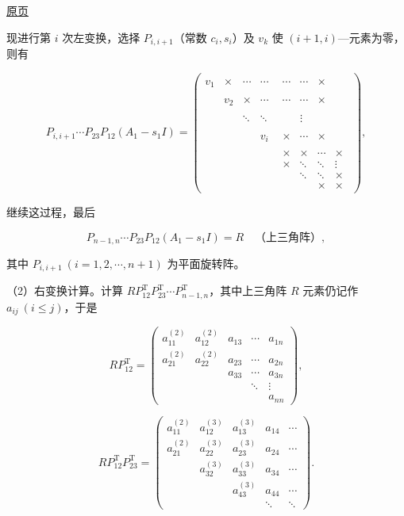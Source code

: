 \documentclass[
  10pt,
  fontset=fandol]{ctexart}
\begin{document}
\href{../../source-images/pdf-257.jpeg}{原页}

现进行第 \(i\) 次左变换，选择 \(P_{i,i+1}\)（常数 \(c_i,s_i\)）及 \(v_k\) 使 \((i+1,i)\)---元素为零，则有

\[
P_{i,i+1}\cdots P_{23}P_{12}(A_1-s_1I)
=\begin{pmatrix}
v_1&\times&\cdots&\cdots&\begin{matrix}\cdots&\cdots&\times\end{matrix}\\
&v_2&\times&\cdots&\begin{matrix}\cdots&\cdots&\times\end{matrix}\\
&&\ddots&\ddots&\begin{matrix}&&\vdots\end{matrix}\\
&&&v_i&\begin{matrix}\times&\cdots&\times\end{matrix}\\
&&&&\boxed{\begin{matrix}
\times&\times&\cdots&\times\\
\times&\ddots&\ddots&\vdots\\
&\ddots&\ddots&\times\\
&&\times&\times
\end{matrix}}
\end{pmatrix},
\]

继续这过程，最后

\[
P_{n-1,n}\cdots P_{23}P_{12}(A_1-s_1I)=R\quad\text{（上三角阵）},
\]

其中 \(P_{i,i+1}\ (i=1,2,\cdots,n+1)\) 为平面旋转阵。

（2）右变换计算。计算 \(RP_{12}^{\mathrm T}P_{23}^{\mathrm T}\cdots P_{n-1,n}^{\mathrm T}\)，其中上三角阵 \(R\) 元素仍记作 \(a_{ij}\ (i\leq j)\)，于是

\[
RP_{12}^{\mathrm T}=\begin{pmatrix}
a_{11}^{(2)}&a_{12}^{(2)}&a_{13}&\cdots&a_{1n}\\
a_{21}^{(2)}&a_{22}^{(2)}&a_{23}&\cdots&a_{2n}\\
&&a_{33}&\cdots&a_{3n}\\
&&&\ddots&\vdots\\
&&&&a_{nn}
\end{pmatrix},
\]

\[
RP_{12}^{\mathrm T}P_{23}^{\mathrm T}=\begin{pmatrix}
a_{11}^{(2)}&a_{12}^{(3)}&a_{13}^{(3)}&a_{14}&\cdots\\
a_{21}^{(2)}&a_{22}^{(3)}&a_{23}^{(3)}&a_{24}&\cdots\\
&a_{32}^{(3)}&a_{33}^{(3)}&a_{34}&\cdots\\
&&a_{43}^{(3)}&a_{44}&\cdots\\
&&&\ddots&\ddots
\end{pmatrix}.
\]
\end{document}
